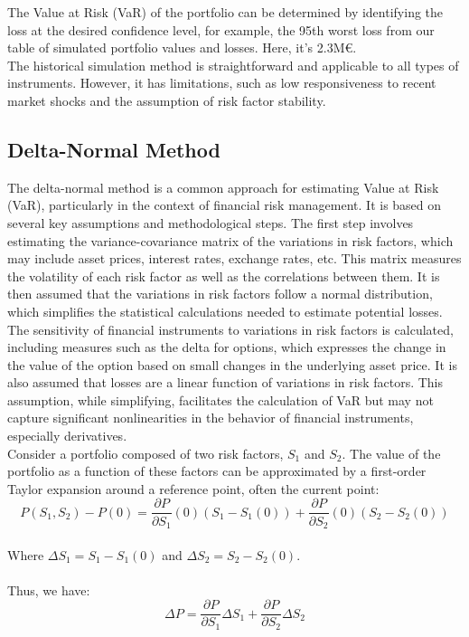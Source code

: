 \documentclass[a4paper,10pt]{article}
\begin{document}
\noindent The Value at Risk (VaR) of the portfolio can be determined by identifying the loss at the desired confidence level, for example, the 95th worst loss from our table of simulated portfolio values and losses. Here, it's 2.3M€.\\

\noindent The historical simulation method is straightforward and applicable to all types of instruments. However, it has limitations, such as low responsiveness to recent market shocks and the assumption of risk factor stability.\\

\subsection{Delta-Normal Method}

\noindent The delta-normal method is a common approach for estimating Value at Risk (VaR), particularly in the context of financial risk management. It is based on several key assumptions and methodological steps. The first step involves estimating the variance-covariance matrix of the variations in risk factors, which may include asset prices, interest rates, exchange rates, etc. This matrix measures the volatility of each risk factor as well as the correlations between them. It is then assumed that the variations in risk factors follow a normal distribution, which simplifies the statistical calculations needed to estimate potential losses.\\

\noindent The sensitivity of financial instruments to variations in risk factors is calculated, including measures such as the delta for options, which expresses the change in the value of the option based on small changes in the underlying asset price. It is also assumed that losses are a linear function of variations in risk factors. This assumption, while simplifying, facilitates the calculation of VaR but may not capture significant nonlinearities in the behavior of financial instruments, especially derivatives.\\

\noindent Consider a portfolio composed of two risk factors, \( S_1 \) and \( S_2 \). The value of the portfolio as a function of these factors can be approximated by a first-order Taylor expansion around a reference point, often the current point:\\
\[P(S_1, S_2) - P(0) = \frac{\partial P}{\partial S_1}(0)(S_1 - S_1(0)) + \frac{\partial P}{\partial S_2}(0)(S_2 - S_2(0))\]\\
Where \( \Delta S_1 = S_1 - S_1(0) \) and \( \Delta S_2 = S_2 - S_2(0) \). \\\\Thus, we have:\\
\[\Delta P = \frac{\partial P}{\partial S_1} \Delta S_1 + \frac{\partial P}{\partial S_2} \Delta S_2\]\\
\end{document}
